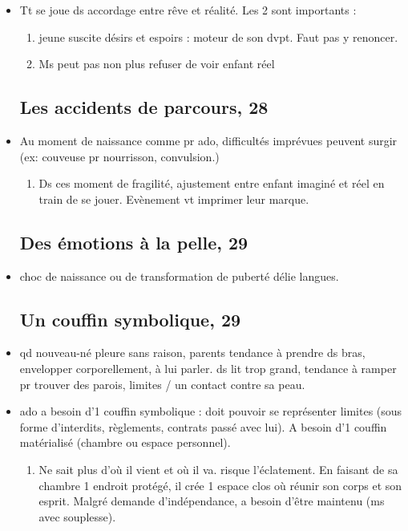 \documentclass[12pt]{report}
\begin{document}
\begin{itemize}
\item Tt se joue ds accordage entre rêve et réalité. Les 2 sont importants : 
\begin{enumerate}
\item jeune suscite désirs et espoirs : moteur de son dvpt. Faut pas y renoncer.
\item Ms peut pas non plus refuser de voir enfant réel

\end{enumerate}


\subsection{Les accidents de parcours, 28}

\item Au moment de naissance comme pr ado, difficultés imprévues peuvent surgir (ex: couveuse pr nourrisson, convulsion.)
\begin{enumerate}
\item Ds ces moment de fragilité, ajustement entre enfant imaginé et réel en train de se jouer. Evènement vt imprimer leur marque. \\
\end{enumerate}



\subsection{Des émotions à la pelle, 29}

\item choc de naissance ou de transformation de puberté délie langues. 

\subsection{Un couffin symbolique, 29}

\item qd nouveau-né pleure sans raison, parents tendance à prendre ds bras, envelopper corporellement, à lui parler. ds lit trop grand, tendance à ramper pr trouver des parois, limites / un contact contre sa peau. \\

\item ado a besoin d'1 couffin symbolique : doit pouvoir se représenter limites (sous forme d'interdits, règlements, contrats passé avec lui).  A besoin d'1 couffin matérialisé (chambre ou espace personnel).
\begin{enumerate}
\item Ne sait plus d'où il vient et où il va.  risque l'éclatement. En faisant de sa chambre 1 endroit protégé, il crée 1 espace clos où réunir son corps et son esprit. Malgré demande d'indépendance, a besoin d'être maintenu (ms avec souplesse).
\end{enumerate}


\end{itemize}
\end{document}

